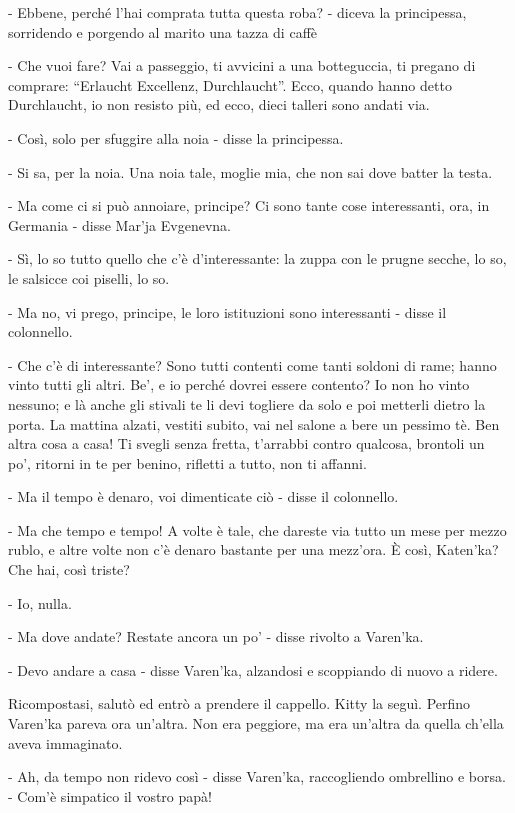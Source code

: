 - Ebbene, perché l'hai comprata tutta questa roba? - diceva la principessa, sorridendo e porgendo al marito una tazza di caffè 

- Che vuoi fare? Vai a passeggio, ti avvicini a una botteguccia, ti pregano di comprare: ``Erlaucht Excellenz, Durchlaucht''. Ecco, quando hanno detto Durchlaucht, io non resisto più, ed ecco, dieci talleri sono andati via. 

- Così, solo per sfuggire alla noia - disse la principessa. 

- Si sa, per la noia. Una noia tale, moglie mia, che non sai dove batter la testa. 

- Ma come ci si può annoiare, principe? Ci sono tante cose interessanti, ora, in Germania - disse Mar'ja Evgenevna. 

- Sì, lo so tutto quello che c'è d'interessante: la zuppa con le prugne secche, lo so, le salsicce coi piselli, lo so. 

- Ma no, vi prego, principe, le loro istituzioni sono interessanti - disse il colonnello. 

- Che c'è di interessante? Sono tutti contenti come tanti soldoni di rame; hanno vinto tutti gli altri. Be', e io perché dovrei essere contento? Io non ho vinto nessuno; e là anche gli stivali te li devi togliere da solo e poi metterli dietro la porta. La mattina alzati, vestiti subito, vai nel salone a bere un pessimo tè. Ben altra cosa a casa! Ti svegli senza fretta, t'arrabbi contro qualcosa, brontoli un po', ritorni in te per benino, rifletti a tutto, non ti affanni. 

- Ma il tempo è denaro, voi dimenticate ciò - disse il colonnello. 

- Ma che tempo e tempo! A volte è tale, che dareste via tutto un mese per mezzo rublo, e altre volte non c'è denaro bastante per una mezz'ora. È così, Katen'ka? Che hai, così triste? 

- Io, nulla. 

- Ma dove andate? Restate ancora un po' - disse rivolto a Varen'ka. 

- Devo andare a casa - disse Varen'ka, alzandosi e scoppiando di nuovo a ridere. 

Ricompostasi, salutò ed entrò a prendere il cappello. Kitty la seguì. Perfino Varen'ka pareva ora un'altra. Non era peggiore, ma era un'altra da quella ch'ella aveva immaginato. 

- Ah, da tempo non ridevo così - disse Varen'ka, raccogliendo ombrellino e borsa. - Com'è simpatico il vostro papà! 


